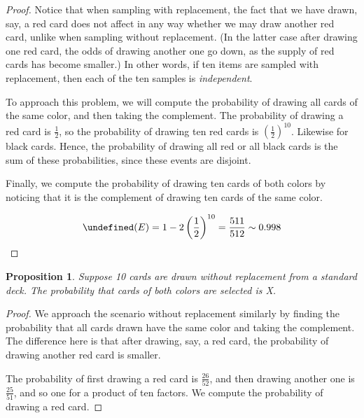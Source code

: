 \documentclass[letterpaper,11pt]{article}
\newtheorem{proposition}{Proposition}
\let\P\undefined
\DeclareMathOperator{\P}{\mathbb{P}}
\newcommand{\half}{\frac{1}{2}}
\newcommand{\parens}[1]{\left(#1\right)}
\begin{document}
\begin{enumerate}
        \begin{proof}
            Notice that when sampling with replacement, the fact that we have
            drawn, say, a red card does not affect in any way whether we may
            draw another red card, unlike when sampling without replacement.
            (In the latter case after drawing one red card, the odds of drawing
            another one go down, as the supply of red cards has become
            smaller.)
            In other words, if ten items are sampled with replacement, then
            each of the ten samples is \emph{independent}.

            To approach this problem, we will compute the probability of
            drawing all cards of the same color, and then taking the
            complement.
            The probability of drawing a red card is $\half$, so the
            probability of drawing ten red cards is $\left(\half\right)^{10}$.
            Likewise for black cards. Hence, the probability of drawing all red
            or all black cards is the sum of these probabilities, since these
            events are disjoint.

            Finally, we compute the probability of drawing ten cards of both
            colors by noticing that it is the complement of drawing ten cards
            of the same color.

            \begin{equation*}
                \P(E) = 1 - 2 \parens{\half}^{10} = \frac{511}{512} \sim 0.998
            \end{equation*}
        \end{proof}

        \begin{proposition}
            Suppose 10 cards are drawn without replacement from a standard
            deck. The probability that cards of both colors are selected is X.
        \end{proposition}

        \begin{proof}
            We approach the scenario without replacement similarly by finding
            the probability that all cards drawn have the same color and taking
            the complement. The difference here is that after drawing, say, a
            red card, the probability of drawing another red card is smaller.

            The probability of first drawing a red card is $\frac{26}{52}$, and
            then drawing another one is $\frac{25}{51}$, and so one for a
            product of ten factors. We compute the probability of drawing a red
            card.


\end{proof}
\end{enumerate}
\end{document}
